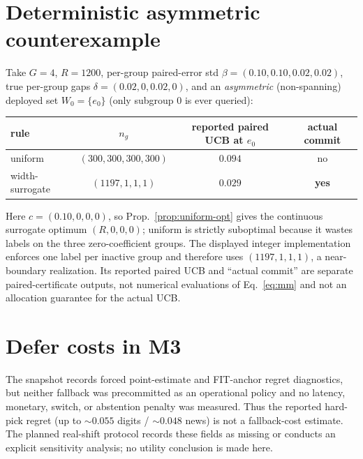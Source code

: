 \documentclass{article}
\begin{document}
\section{Deterministic asymmetric counterexample}
\label{app:counter}
Take $G{=}4$, $R{=}1200$, per-group paired-error std $\beta=(0.10,0.10,0.02,0.02)$, true
per-group gaps $\delta=(0.02,0,0.02,0)$, and an \emph{asymmetric} (non-spanning) deployed set
$W_0=\{e_0\}$ (only subgroup $0$ is ever queried):
\begin{center}
\begin{tabular}{lccc}
\toprule
rule & $n_g$ & reported paired UCB at $e_0$ & actual commit \\
\midrule
uniform & $(300,300,300,300)$ & $0.094$ & no \\
width-surrogate & $(1197,1,1,1)$ & $0.029$ & \textbf{yes} \\
\bottomrule
\end{tabular}
\end{center}
Here $c=(0.10,0,0,0)$, so Prop.~\ref{prop:uniform-opt} gives the continuous surrogate optimum
$(R,0,0,0)$; uniform is strictly suboptimal because it wastes labels on the three
zero-coefficient groups. The displayed integer implementation enforces one label per inactive
group and therefore uses $(1197,1,1,1)$, a near-boundary realization. Its reported paired UCB
and ``actual commit'' are separate paired-certificate outputs, not numerical evaluations of
Eq.~\eqref{eq:mm} and not an allocation guarantee for the actual UCB.

\section{Defer costs in M3}
\label{app:m3}
The snapshot records forced point-estimate and FIT-anchor regret diagnostics, but neither
fallback was precommitted as an operational policy and no latency, monetary, switch, or
abstention penalty was measured. Thus the reported hard-pick regret (up to $\sim0.055$ digits /
$\sim0.048$ news) is not a fallback-cost estimate. The planned real-shift protocol records
these fields as missing or conducts an explicit sensitivity analysis; no utility conclusion is
made here.
\end{document}
